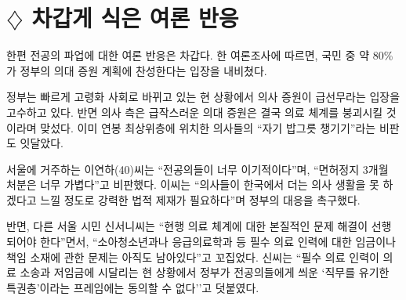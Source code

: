 \documentclass{translation}
\begin{document}
\section*{\( \diamondsuit \) 차갑게 식은 여론 반응} 
한편 전공의 파업에 대한 여론 반응은 차갑다.
한 여론조사에 따르면, 국민 중 약 80\%가 정부의 의대 증원 계획에 찬성한다는 입장을 내비쳤다.

정부는 빠르게 고령화 사회로 바뀌고 있는 현 상황에서 의사 증원이 급선무라는 입장을 고수하고 있다.
반면 의사 측은 급작스러운 의대 증원은 결국 의료 체계를 붕괴시킬 것이라며 맞섰다.
이미 연봉 최상위층에 위치한 의사들의 ``자기 밥그릇 챙기기''라는 비판도 잇달았다.

서울에 거주하는 이연하(40)씨는 ``전공의들이 너무 이기적이다''며, ``면허정지 3개월 처분은 너무 가볍다''고 비판했다.
이씨는 ``의사들이 한국에서 더는 의사 생활을 못 하겠다고 느낄 정도로 강력한 법적 제재가 필요하다''며 정부의 대응을 촉구했다.

반면, 다른 서울 시민 신서니씨는 ``현행 의료 체계에 대한 본질적인 문제 해결이 선행되어야 한다''면서, ``소아청소년과나 응급의료학과 등 필수 의료 인력에 대한 임금이나 책임 소재에 관한 문제는 아직도 남아있다''고 꼬집었다.
신씨는 ``필수 의료 인력이 의료 소송과 저임금에 시달리는 현 상황에서 정부가 전공의들에게 씌운 `직무를 유기한 특권층'이라는 프레임에는 동의할 수 없다''고 덧붙였다.
\end{document}
